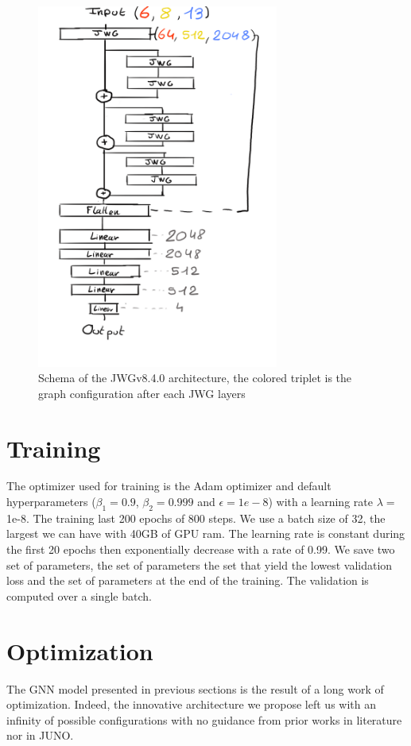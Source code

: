 \documentclass[../main.tex]{subfiles}
\begin{document}
\begin{figure}
  \centering
  \includegraphics[height=12cm]{images/jgnn/jwgv8_4.png}
  \caption{Schema of the JWGv8.4.0 architecture, the colored triplet is the graph configuration after each JWG layers}
  \label{fig:jgnn:model-schematic}
\end{figure}


\section{Training}

The optimizer used for training is the Adam optimizer and default hyperparameters ($\beta_1= 0.9$, $\beta_2 = 0.999$ and $\epsilon = 1e-8$) with a learning rate $\lambda = $ 1e-8. The training last 200 epochs of 800 steps. We use a batch size of 32, the largest we can have with 40GB of GPU ram. The learning rate is constant during the first 20 epochs then exponentially decrease with a rate of 0.99. We save two set of parameters, the set of parameters the set that yield the lowest validation loss and the set of parameters at the end of the training. The validation is computed over a single batch.

\section{Optimization}

The GNN model presented in previous sections is the result of a long work of optimization. Indeed, the innovative architecture we propose left us with an infinity of possible configurations with no guidance from prior works in literature nor in JUNO.
\end{document}
